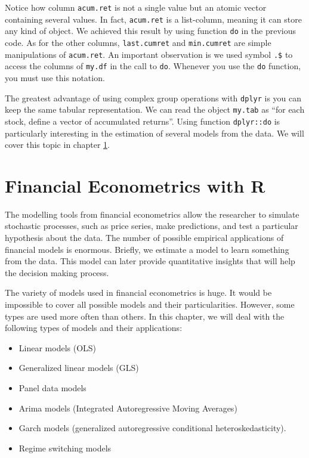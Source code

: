 \documentclass[11pt,]{book}
\providecommand{\tightlist}{%
  \setlength{\itemsep}{0pt}\setlength{\parskip}{0pt}}
\begin{document}
Notice how column \texttt{acum.ret} is not a single value but an atomic
vector containing several values. In fact, \texttt{acum.ret} is a
list-column, meaning it can store any kind of object. We achieved this
result by using function \texttt{do} in the previous code. As for the
other columns, \texttt{last.cumret} and \texttt{min.cumret} are simple
manipulations of \texttt{acum.ret}. An important observation is we used
symbol \texttt{.\$} to access the columns of \texttt{my.df} in the call
to \texttt{do}. Whenever you use the \texttt{do} function, you must use
this notation.

The greatest advantage of using complex group operations with
\texttt{dplyr} is you can keep the same tabular representation. We can
read the object \texttt{my.tab} as ``for each stock, define a vector of
accumulated returns''. Using function \texttt{dplyr::do} is particularly
interesting in the estimation of several models from the data. We will
cover this topic in chapter \ref{models}.

\hypertarget{models}{\chapter{Financial Econometrics with
R}\label{models}}

The modelling tools from financial econometrics allow the researcher to
simulate stochastic processes, such as price series, make predictions,
and test a particular hypothesis about the data. The number of possible
empirical applications of financial models is enormous. Briefly, we
estimate a model to learn something from the data. This model can later
provide quantitative insights that will help the decision making
process.

The variety of models used in financial econometrics is huge. It would
be impossible to cover all possible models and their particularities.
However, some types are used more often than others. In this chapter, we
will deal with the following types of models and their applications:

\begin{itemize}
\tightlist
\item
  Linear models (OLS)
\item
  Generalized linear models (GLS)
\item
  Panel data models
\item
  Arima models (Integrated Autoregressive Moving Averages)
\item
  Garch models (generalized autoregressive conditional
  heteroskedasticity).
\item
  Regime switching models
\end{itemize}
\end{document}
